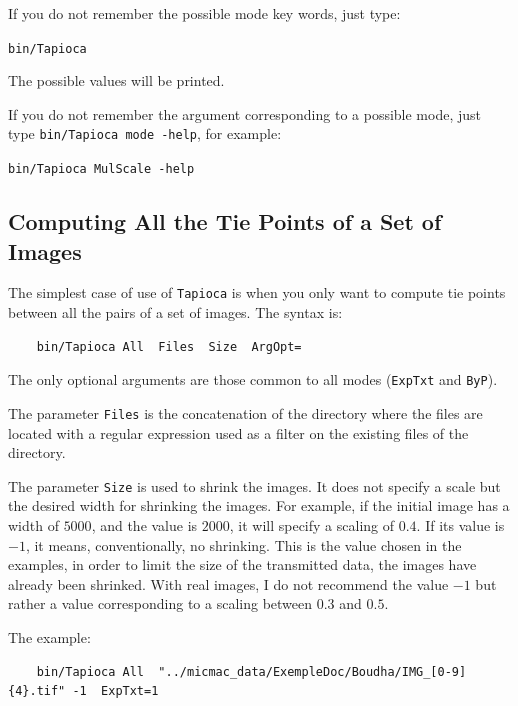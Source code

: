 If you do not remember the possible mode key words, just type: 

\begin{center}
        {\tt bin/Tapioca}
\end{center}

The possible values will be printed. 

If you do not remember the argument 
corresponding to a possible mode, just type {\tt bin/Tapioca mode -help},
for example:

\begin{center}
        {\tt bin/Tapioca MulScale -help}
\end{center}




\subsection{Computing All the Tie Points of a Set of Images}

The simplest case of use of {\tt Tapioca} is when you only want to compute tie points
between all the pairs of a set of images. The syntax is: 

{\scriptsize
\begin{verbatim}
    bin/Tapioca All  Files  Size  ArgOpt=
\end{verbatim}
}

The only optional arguments are those common to all modes ({\tt ExpTxt}  and {\tt ByP}).

The parameter {\tt Files} is the concatenation of the directory where the files
are located with a regular expression used as a filter on the existing files
of the directory.

The parameter {\tt Size} is used to shrink the images. It does not specify
a scale but the desired width for shrinking the images. For example, if the initial
image has a width of $5000$, and the value is $2000$, it will specify
a scaling of $0.4$. If its value is $-1$, it means, conventionally, no shrinking.
This is the value chosen in the examples, in order  to limit the size of the transmitted
data, the images have already been shrinked. With real images, I do not
recommend the value $-1$ but rather a value corresponding to a scaling
between $0.3$ and $0.5$.


The example:

{\scriptsize
\begin{verbatim}
    bin/Tapioca All  "../micmac_data/ExempleDoc/Boudha/IMG_[0-9]{4}.tif" -1  ExpTxt=1
\end{verbatim}
}

